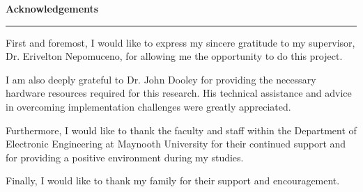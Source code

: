 \begin{center}
    {\Large \textbf{Acknowledgements}}
    \vspace{1cm}
    \rule{0.9\textwidth}{0.4pt} %
\end{center}

\noindent First and foremost, I would like to express my sincere gratitude to my supervisor, Dr. Erivelton Nepomuceno, for allowing me the opportunity to do this project.

\vspace{1em}

\noindent I am also deeply grateful to Dr. John Dooley for providing the necessary hardware resources required for this research. His technical assistance and advice in overcoming implementation challenges were greatly appreciated.

\vspace{1em}

\noindent Furthermore, I would like to thank the faculty and staff within the Department of Electronic Engineering at Maynooth University for their continued support and for providing a positive environment during my studies.

\vspace{1em}

\noindent Finally, I would like to thank my family for their support and encouragement.

\vspace{2cm}

\noindent

\medskip %

\noindent
